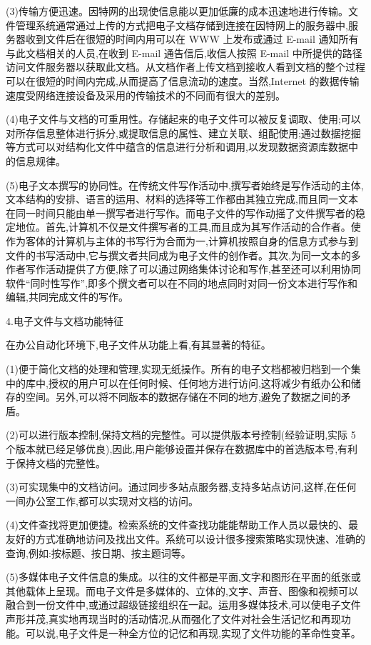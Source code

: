     (3)传输方便迅速。因特网的出现使信息能以更加低廉的成本迅速地进行传输。文件管理系统通常通过上传的方式把电子文档存储到连接在因特网上的服务器中,服务器收到文件后在很短的时间内用可以在 WWW 上发布或通过 E-mail 通知所有与此文档相关的人员,在收到 E-mail 通告信后,收信人按照 E-mail 中所提供的路径访问文件服务器以获取此文档。从文档作者上传文档到接收人看到文档的整个过程可以在很短的时间内完成,从而提高了信息流动的速度。当然,Internet 的数据传输速度受网络连接设备及采用的传输技术的不同而有很大的差别。

    (4)电子文件与文档的可重用性。存储起来的电子文件可以被反复调取、使用;可以对所存信息整体进行拆分,或提取信息的属性、建立关联、组配使用;通过数据挖掘等方式可以对结构化文件中蕴含的信息进行分析和调用,以发现数据资源库数据中的信息规律。

    (5)电子文本撰写的协同性。在传统文件写作活动中,撰写者始终是写作活动的主体,文本结构的安排、语言的运用、材料的选择等工作都由其独立完成,而且同一文本在同一时间只能由单一撰写者进行写作。而电子文件的写作动摇了文件撰写者的稳定地位。首先,计算机不仅是文件撰写者的工具,而且成为其写作活动的合作者。使作为客体的计算机与主体的书写行为合而为一,计算机按照自身的信息方式参与到文件的书写活动中,它与撰文者共同成为电子文件的创作者。其次,为同一文本的多作者写作活动提供了方便,除了可以通过网络集体讨论和写作,甚至还可以利用协同软件“同时性写作”,即多个撰文者可以在不同的地点同时对同一份文本进行写作和编辑,共同完成文件的写作。

    4.电子文件与文档功能特征

    在办公自动化环境下,电子文件从功能上看,有其显著的特征。

    (1)便于简化文档的处理和管理,实现无纸操作。所有的电子文档都被归档到一个集中的库中,授权的用户可以在任何时候、任何地方进行访问,这将减少有纸办公和储存的空间。另外,可以将不同版本的数据存储在不同的地方,避免了数据之间的矛盾。

    (2)可以进行版本控制,保持文档的完整性。可以提供版本号控制(经验证明,实际 5个版本就已经足够优良),因此,用户能够设置并保存在数据库中的首选版本号,有利于保持文档的完整性。

    (3)可实现集中的文档访问。通过同步多站点服务器,支持多站点访问,这样,在任何一间办公室工作,都可以实现对文档的访问。

    (4)文件查找将更加便捷。检索系统的文件查找功能能帮助工作人员以最快的、最友好的方式准确地访问及找出文件。系统可以设计很多搜索策略实现快速、准确的查询,例如:按标题、按日期、按主题词等。

    (5)多媒体电子文件信息的集成。以往的文件都是平面,文字和图形在平面的纸张或其他载体上呈现。而电子文件是多媒体的、立体的,文字、声音、图像和视频可以融合到一份文件中,或通过超级链接组织在一起。运用多媒体技术,可以使电子文件声形并茂,真实地再现当时的活动情况,从而强化了文件对社会生活记忆和再现功能。可以说,电子文件是一种全方位的记忆和再现,实现了文件功能的革命性变革。

